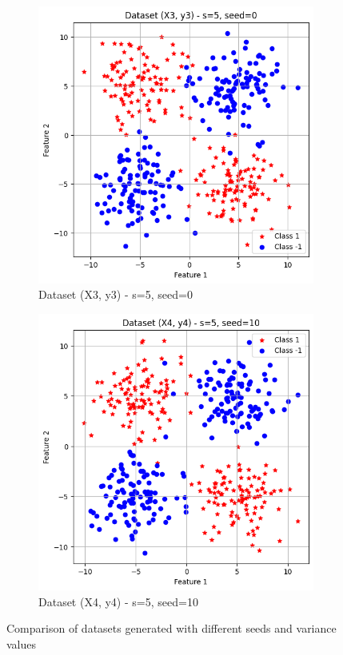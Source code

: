 \documentclass[a4paper,12pt]{article}
\begin{document}
\begin{figure}[H]
    \begin{subfigure}{0.45\textwidth}
        \centering
        \includegraphics[width=\textwidth]{PR dataset3.png}
        \caption{Dataset (X3, y3) - s=5, seed=0}
        \label{fig:dataset3}
    \end{subfigure}
    \hfill
    \begin{subfigure}{0.45\textwidth}
        \centering
        \includegraphics[width=\textwidth]{PR dataset4.png}
        \caption{Dataset (X4, y4) - s=5, seed=10}
        \label{fig:dataset4}
    \end{subfigure}

    \caption{Comparison of datasets generated with different seeds and variance values}
    \label{fig:all_datasets}
\end{figure}
\end{document}
